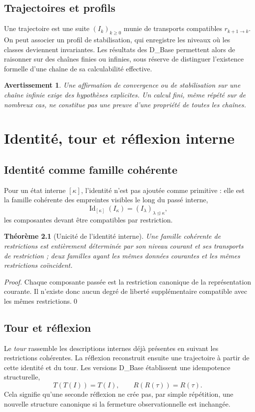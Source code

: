 \documentclass[11pt,a4paper,openany]{book}
\newtheorem{theorem}[definition]{Théorème}
\newtheorem{warning}[definition]{Avertissement}
\begin{document}
\section{Trajectoires et profils}
Une trajectoire est une suite \((I_k)_{k\ge0}\) munie de transports compatibles \(r_{k+1\to k}\). On peut associer un profil de stabilisation, qui enregistre les niveaux où les classes deviennent invariantes. Les résultats des D\_Base permettent alors de raisonner sur des chaînes finies ou infinies, sous réserve de distinguer l'existence formelle d'une chaîne de sa calculabilité effective.

\begin{warning}
Une affirmation de convergence ou de stabilisation sur une chaîne infinie exige des hypothèses explicites. Un calcul fini, même répété sur de nombreux cas, ne constitue pas une preuve d'une propriété de toutes les chaînes.
\end{warning}

\chapter{Identité, tour et réflexion interne}
\section{Identité comme famille cohérente}
Pour un état interne \([\kappa]\), l'identité n'est pas ajoutée comme primitive : elle est la famille cohérente des empreintes visibles le long du passé interne,
\[
\operatorname{Id}_{[\kappa]}(I_\kappa)=
(I_\lambda)_{\lambda\trianglelefteq\kappa},
\]
les composantes devant être compatibles par restriction.

\begin{theorem}[Unicité de l'identité interne]
Une famille cohérente de restrictions est entièrement déterminée par son niveau courant et ses transports de restriction ; deux familles ayant les mêmes données courantes et les mêmes restrictions coïncident.
\end{theorem}
\begin{proof}
Chaque composante passée est la restriction canonique de la représentation courante. Il n'existe donc aucun degré de liberté supplémentaire compatible avec les mêmes restrictions.\qed\end{proof}

\section{Tour et réflexion}
Le \emph{tour} rassemble les descriptions internes déjà présentes en suivant les restrictions cohérentes. La réflexion reconstruit ensuite une trajectoire à partir de cette identité et du tour. Les versions D\_Base établissent une idempotence structurelle,
\[
T(T(I))=T(I),\qquad R(R(\tau))=R(\tau).
\]
Cela signifie qu'une seconde réflexion ne crée pas, par simple répétition, une nouvelle structure canonique si la fermeture observationnelle est inchangée.
\end{document}
